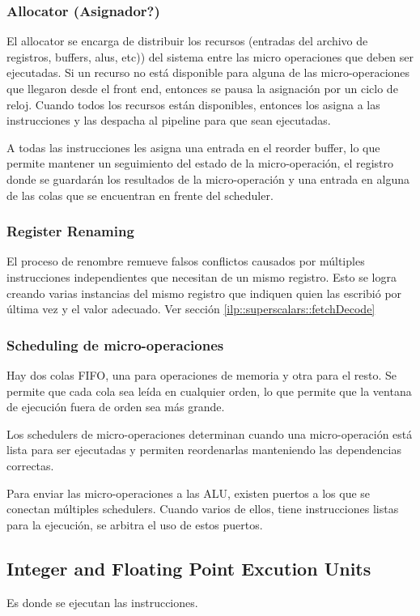 \subsubsection*{Allocator (Asignador?)}
El allocator se encarga de distribuir los recursos (entradas del archivo de registros, buffers, alus, etc)) del sistema entre las micro operaciones que deben ser ejecutadas. Si un recurso no está disponible para alguna de las micro-operaciones que llegaron desde el front end, entonces se pausa la asignación por un ciclo de reloj. Cuando todos los recursos están disponibles, entonces los asigna a las instrucciones y las despacha al pipeline para que sean ejecutadas.

A todas las instrucciones les asigna una entrada en el reorder buffer, lo que permite mantener un seguimiento del estado de la micro-operación, el registro donde se guardarán los resultados de la micro-operación y una entrada en alguna de las colas que se encuentran en frente del scheduler.

\subsubsection*{Register Renaming}
El proceso de renombre remueve falsos conflictos causados por múltiples instrucciones independientes que necesitan de un mismo registro. Esto se logra creando varias instancias del mismo registro que indiquen quien las escribió por última vez y el valor adecuado. Ver sección \ref{ilp::superscalars::fetchDecode} 

\subsubsection*{Scheduling de micro-operaciones}
Hay dos colas FIFO, una para operaciones de memoria y otra para el resto. Se permite que cada cola sea leída en cualquier orden, lo que permite que la ventana de ejecución fuera de orden sea más grande.

Los schedulers de micro-operaciones determinan cuando una micro-operación está lista para ser ejecutadas y permiten reordenarlas manteniendo las dependencias correctas. 

Para enviar las micro-operaciones a las ALU, existen puertos a los que se conectan múltiples schedulers. Cuando varios de ellos, tiene instrucciones listas para la ejecución, se arbitra el uso de estos puertos. 

\subsection{Integer and Floating Point Excution Units}
Es donde se ejecutan las instrucciones. 

